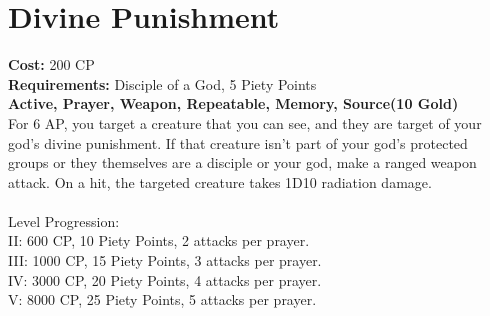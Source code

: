 \section{Divine Punishment}
\textbf{Cost:} 200 CP\\
\textbf{Requirements:} Disciple of a God, 5 Piety Points \\
\textbf{Active, Prayer, Weapon, Repeatable, Memory, Source(10 Gold)}\\
For 6 AP, you target a creature that you can see, and they are target of your god's divine punishment. If that creature isn't part of your god's protected groups or they themselves are a disciple or your god, make a ranged weapon attack. On a hit, the targeted creature takes 1D10 radiation damage.\\
\\
Level Progression:\\
II: 600 CP, 10 Piety Points, 2 attacks per prayer.\\
III: 1000 CP, 15 Piety Points, 3 attacks per prayer.\\
IV: 3000 CP, 20 Piety Points, 4 attacks per prayer.\\
V: 8000 CP, 25 Piety Points, 5 attacks per prayer.\\